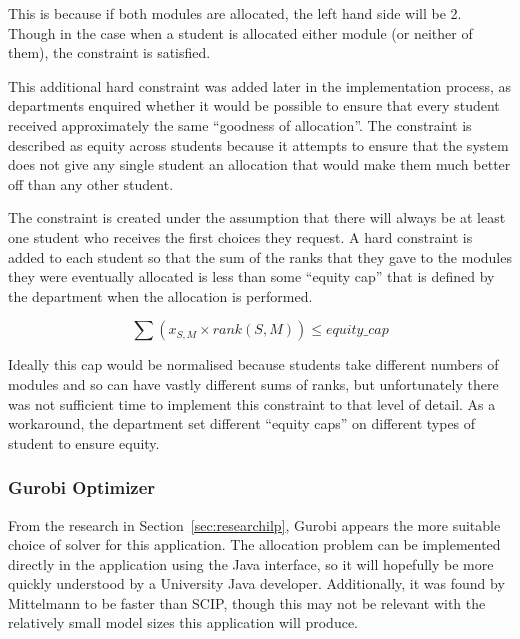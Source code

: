 This is because if both modules are allocated, the left hand side will be 2.
Though in the case when a student is allocated either module (or neither of
them), the constraint is satisfied.


This additional hard constraint was added later in the implementation process,
as departments enquired whether it would be possible to ensure that every
student received approximately the same ``goodness of allocation''. The
constraint is described as equity across students because it attempts to
ensure that the system does not give any single student an allocation that
would make them much better off than any other student.

The constraint is created under the assumption that there will always be at
least one student who receives the first choices they request. A hard
constraint is added to each student so that the sum of the ranks that they
gave to the modules they were eventually allocated is less than some ``equity
cap'' that is defined by the department when the allocation is performed.

$$
\displaystyle\sum (x_{S,M} \times rank(S,M)) \leq equity\_cap
$$

Ideally this cap would be normalised because students take different numbers
of modules and so can have vastly different sums of ranks, but unfortunately
there was not sufficient time to implement this constraint to that level of
detail. As a workaround, the department set different ``equity caps'' on
different types of student to ensure equity.

\subsubsection{Gurobi Optimizer}

From the research in Section~\ref{sec:researchilp}, Gurobi appears the more
suitable choice of solver for this application. The allocation problem can be
implemented directly in the application using the Java interface, so it will
hopefully be more quickly understood by a University Java developer.
Additionally, it was found by Mittelmann to be faster than SCIP, though this
may not be relevant with the relatively small model sizes this application
will produce.


